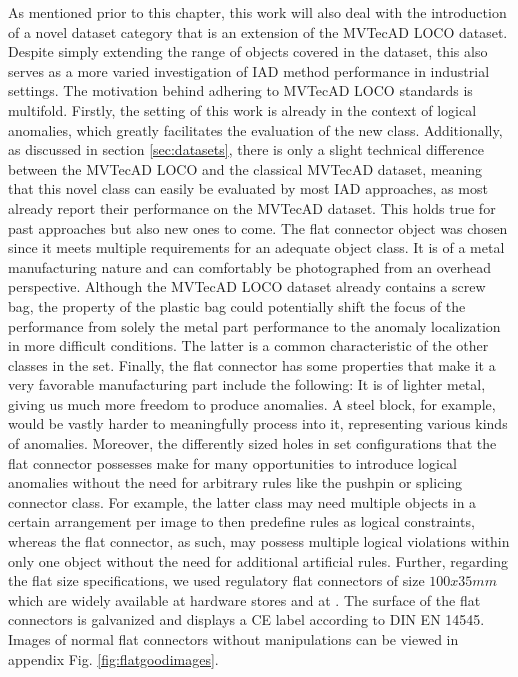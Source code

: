 As mentioned prior to this chapter, this work will also deal with the introduction of a novel dataset category that is an extension of the MVTecAD LOCO \cite{LOCODentsAndScratchesBergmann2022} dataset. 
Despite simply extending the range of objects covered in the dataset, this also serves as a more varied investigation of IAD method performance in industrial settings. The motivation behind adhering 
to MVTecAD LOCO standards is multifold. Firstly, the setting of this work is already in the context of logical anomalies, which greatly facilitates the evaluation of the new class. Additionally, as 
discussed in section \ref{sec:datasets}, there is only a slight technical difference between the MVTecAD LOCO and the classical MVTecAD \cite{MVTEC_Bergmann_2021} dataset, meaning that this novel 
class can easily be evaluated by most IAD approaches, as most already report their performance on the MVTecAD dataset. This holds true for past approaches but also new ones 
to come.
\newline\newline
The flat connector object was chosen since it meets multiple requirements for an adequate object class. It is of a metal manufacturing nature and can comfortably be photographed from 
an overhead perspective. Although the MVTecAD LOCO dataset already contains a screw bag, the property of the plastic bag could potentially shift the focus of the performance from solely the metal 
part performance to the anomaly localization in more difficult conditions. The latter is a common characteristic of the other classes in the set. Finally, the flat connector has some 
properties that make it a very favorable manufacturing part include the following: It is of lighter metal, giving us much more freedom to produce anomalies. A steel block, for example, would be vastly 
harder to meaningfully process into it, representing various kinds of anomalies. Moreover, the differently sized holes in set configurations that the flat connector possesses make for many opportunities 
to introduce logical anomalies without the need for arbitrary rules like the pushpin or splicing connector class. For example, the latter class may need multiple objects in a certain arrangement per image to then predefine 
rules as logical constraints, whereas the flat connector, as such, may possess multiple logical violations within only one object without the need for additional artificial rules.
\newline
Further, regarding the flat size specifications, we used regulatory flat 
connectors of size $100x35 mm$ which are widely available at hardware stores and at \cite{flatconnectorlink}. The surface of the flat connectors is galvanized 
and displays a CE label according to DIN EN 14545. Images of normal flat connectors without manipulations can be viewed in appendix Fig. \ref{fig:flatgoodimages}.


